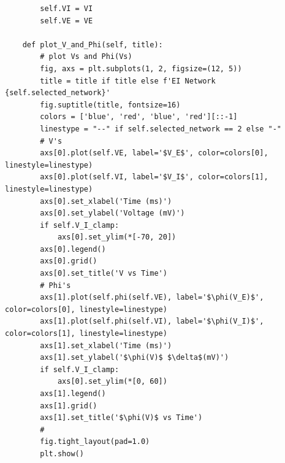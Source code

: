 \documentclass[10pt,twocolumn]{article}
\begin{document}
\begin{verbatim}
        self.VI = VI
        self.VE = VE
    
    def plot_V_and_Phi(self, title):
        # plot Vs and Phi(Vs)
        fig, axs = plt.subplots(1, 2, figsize=(12, 5))
        title = title if title else f'EI Network {self.selected_network}'
        fig.suptitle(title, fontsize=16)
        colors = ['blue', 'red', 'blue', 'red'][::-1]
        linestype = "--" if self.selected_network == 2 else "-"
        # V's
        axs[0].plot(self.VE, label='$V_E$', color=colors[0], linestyle=linestype)
        axs[0].plot(self.VI, label='$V_I$', color=colors[1], linestyle=linestype)
        axs[0].set_xlabel('Time (ms)')
        axs[0].set_ylabel('Voltage (mV)')
        if self.V_I_clamp:
            axs[0].set_ylim(*[-70, 20])
        axs[0].legend()
        axs[0].grid()
        axs[0].set_title('V vs Time')
        # Phi's
        axs[1].plot(self.phi(self.VE), label='$\phi(V_E)$', color=colors[0], linestyle=linestype)
        axs[1].plot(self.phi(self.VI), label='$\phi(V_I)$', color=colors[1], linestyle=linestype)
        axs[1].set_xlabel('Time (ms)')
        axs[1].set_ylabel('$\phi(V)$ $\delta$(mV)')
        if self.V_I_clamp:
            axs[0].set_ylim(*[0, 60])
        axs[1].legend()
        axs[1].grid()
        axs[1].set_title('$\phi(V)$ vs Time')
        # 
        fig.tight_layout(pad=1.0)
        plt.show()


\end{verbatim}
\end{document}

